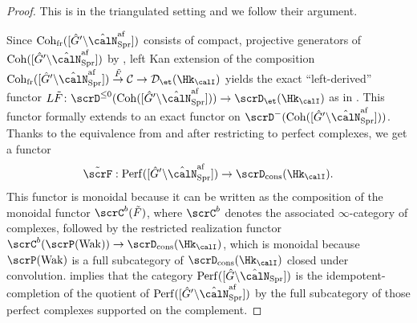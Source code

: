 \documentclass[10pt, reqno]{amsart}
\theoremstyle{plain}
\theoremstyle{definition}
\numberwithin{equation}{section}
\begin{document}
\begin{proof}
	This is \cite[Proposition 6.3.9, Remark 6.3.10]{AR} in the triangulated setting and we follow their argument. 
	
	Since $\mathrm{Coh}_{\mathrm{fr}}([\hat{G}'\backslash \hat{\calN}_{\mathrm{Spr}}^{\mathrm{af}}])$ consists of compact, projective generators of $\mathrm{Coh}([\hat{G}'\backslash \hat{\calN}_{\mathrm{Spr}}^{\mathrm{af}}])$ by , left Kan extension of the composition $\mathrm{Coh}_{\mathrm{fr}}([\hat{G}'\backslash \hat{\calN}_{\mathrm{Spr}}^{\mathrm{af}}])\overset{\tilde{F}}{\to} \mathcal{C}\to \mathcal{D}_\et(\Hk_\calI)$ yields the exact ``left-derived'' functor  $L\tilde{F}\colon \scrD^{\leq 0}(\mathrm{Coh}([\hat{G}'\backslash \hat{\calN}_{\mathrm{Spr}}^{\mathrm{af}}]))\to \scrD_{\et}(\Hk_\calI)$ as in \cite[Theorem 1.3.3.2]{Lur17}. This functor formally extends to an exact functor on $\scrD^-(\mathrm{Coh}([\hat{G}'\backslash \hat{\calN}_{\mathrm{Spr}}^{\mathrm{af}}]))$. Thanks to the equivalence from  and after restricting to perfect complexes, we get a functor
	\begin{equation}
		\tilde{\scrF}: \mathrm{Perf}([\hat{G}'\backslash \hat{\calN}_{\mathrm{Spr}}^{\mathrm{af}} ])\to \scrD_{\mathrm{cons}}(\Hk_{\calI}).
	\end{equation}
	This functor is monoidal because it can be written as the composition of the monoidal functor $\scrC^b(\tilde{F})$, where $\scrC^b$ denotes the associated $\infty$-category of complexes, followed by the restricted realization functor $\scrC^b(\scrP(\mathrm{Wak}) ) \to \scrD_{\mathrm{cons}}(\Hk_{\calI})$, which is monoidal because $\scrP(\mathrm{Wak})$ is a full subcategory of $\scrD_{\mathrm{cons}}(\Hk_{\calI})$ closed under convolution.
	 implies that the category $\mathrm{Perf}([\hat{G}\backslash \hat{\calN}_{\mathrm{Spr}}])$ is the idempotent-completion of the quotient of $\mathrm{Perf}([\hat{G}'\backslash \hat{\calN}^{\mathrm{af}}_{\mathrm{Spr}}])$ by the full subcategory of those perfect complexes supported on the complement. 

\end{proof}
\end{document}

